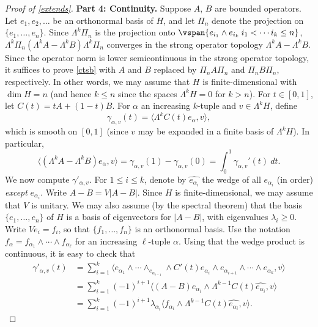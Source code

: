 \documentclass[12pt]{amsart}
\begin{document}
\begin{proof}[Proof of \cref{extends}]
\textbf{Part 4: Continuity.} Suppose $A$, $B$ are bounded operators. Let $e_1,e_2,\ldots$ be an orthonormal basis of $H$, and let $\Pi_n$ denote the projection on $\{e_1,\ldots,e_n\}$. Since $\Lambda^k \Pi_n$ is the projection onto $\vspan\{e_{i_1}\wedge e_{i_k}\: i_1 < \cdots i_k \leq n\}$, $\Lambda^k \Pi_n(\Lambda^k A-\Lambda^k B)\Lambda^k \Pi_n$ converges in the strong operator topology $\Lambda^k A-\Lambda^k B$. Since the operator norm is lower semicontinuous in the strong operator topology, it suffices to prove \eqref{ctsb} with $A$ and $B$ replaced by $\Pi_n A\Pi_n$ and $\Pi_n B \Pi_n$, respectively. In other words, we may assume that $H$ is finite-dimensional with $\dim H = n$ (and hence $k \leq n$ since the spaces $\Lambda^k H = 0$ for $k > n$). For $t \in [0,1]$, let $C(t) = tA + (1-t)B$. For $\alpha$ an increasing $k$-tuple and $v \in \Lambda^{k}H$, define
\[\gamma_{\alpha,v}(t) = \langle \Lambda^kC(t)e_\alpha,v\rangle,\]
which is smooth on $[0,1]$ (since $v$ may be expanded in a finite basis of $\Lambda^k H$).
In particular, 
\begin{equation}\label{FTC}\langle (\Lambda^kA - \Lambda^k B)e_\alpha,v\rangle = \gamma_{\alpha,v}(1)-\gamma_{\alpha,v}(0) = \int_0^1 \gamma_{\alpha,v}'(t)\ dt.\end{equation}
We now compute $\gamma'_{\alpha,v}$. For $1 \leq i \leq k$, denote by $\widehat{e_{\alpha_i}}$ the wedge of all $e_{\alpha_i}$ (in order) \emph{except} $e_{\alpha_i}$. Write $A-B = V|A-B|$. Since $H$ is finite-dimensional, we may assume that $V$ is unitary. We may also assume (by the spectral theorem) that the basis $\{e_1,\ldots,e_n\}$ of $H$ is a basis of eigenvectors for $|A-B|$, with eigenvalues $\lambda_i \geq 0$. Write $Ve_i = f_i$, so that $\{f_1,\ldots,f_n\}$ is an orthonormal basis. Use the notation $f_{\alpha} = f_{\alpha_1} \wedge \cdots \wedge f_{\alpha_\ell}$ for an increasing $\ell$-tuple $\alpha$.
Using that the wedge product is continuous, it is easy to check that
\begin{align*}
\gamma'_{\alpha,v}(t) &= \sum_{i=1}^k \langle e_{\alpha_1}\wedge \cdots \wedge_{e_{\alpha_{i-1}}}\wedge C'(t)e_{\alpha_i}\wedge e_{\alpha_{i+1}}\wedge \cdots \wedge e_{\alpha_k},v\rangle\\
&= \sum_{i=1}^k (-1)^{i+1} \langle (A-B)e_{\alpha_i} \wedge \Lambda^{k-1}C(t)\widehat{e_{\alpha_i}},v\rangle\\
&= \sum_{i=1}^k(-1)^{i+1}\lambda_{\alpha_i}\langle f_{\alpha_i}\wedge \Lambda^{k-1}C(t)\widehat{e_{\alpha_i}},v\rangle.\end{align*}

\end{proof}
\end{document}
